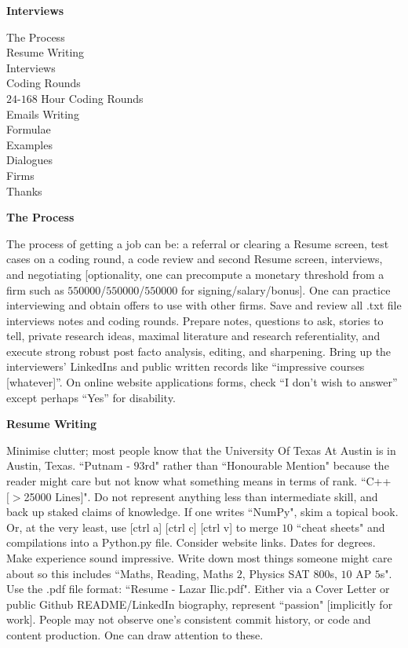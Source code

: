 \huge
\textbf{Interviews}
\Large

The Process \\
Resume Writing \\
Interviews \\
Coding Rounds \\
$24$-$168$ Hour Coding Rounds \\
Emails Writing \\
Formulae \\
Examples \\
Dialogues \\
Firms \\
Thanks

\textbf{The Process}

The process of getting a job can be: a referral or clearing a Resume screen, test cases on a coding round, a code review and second Resume screen, interviews, and negotiating [optionality, one can precompute a monetary threshold from a firm such as $550000$/$550000$/$550000$ for signing/salary/bonus]. One can practice interviewing and obtain offers to use with other firms. Save and review all .txt file interviews notes and coding rounds. Prepare notes, questions to ask, stories to tell, private research ideas, maximal literature and research referentiality, and execute strong robust post facto analysis, editing, and sharpening. Bring up the interviewers' LinkedIns and public written records like ``impressive courses [whatever]''. On online website applications forms, check ``I don't wish to answer'' except perhaps ``Yes'' for disability.

\textbf{Resume Writing}

Minimise clutter; most people know that the University Of Texas At Austin is in Austin, Texas. ``Putnam - $93$rd" rather than ``Honourable Mention" because the reader might care but not know what something means in terms of rank. ``C++ $[>$25000$ \text{ Lines}]$". Do not represent anything less than intermediate skill, and back up staked claims of knowledge. If one writes ``NumPy", skim a topical book. Or, at the very least, use [ctrl a] [ctrl c] [ctrl v] to merge $10$ ``cheat sheets" and compilations into a Python.py file. Consider website links. Dates for degrees. Make experience sound impressive. Write down most things someone might care about so this includes ``Maths, Reading, Maths $2$, Physics SAT $800$s, $10$ AP $5$s". Use the .pdf file format: ``Resume - Lazar Ilic.pdf". Either via a Cover Letter or public Github README/LinkedIn biography, represent ``passion" [implicitly for work]. People may not observe one's consistent commit history, or code and content production. One can draw attention to these.

